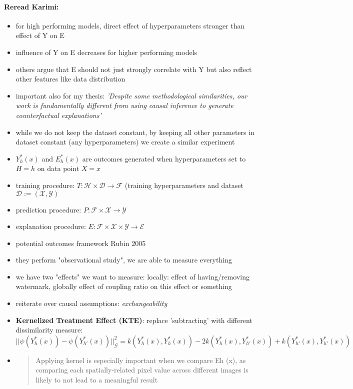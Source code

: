 \paragraph{Reread Karimi:}
\begin{itemize}
    \item for high performing models, direct effect of hyperparameters stronger than effect of Y on E
    \item influence of Y on E decreases for higher performing models
    \item others argue that E should not just strongly correlate with Y but also reflect other features like data distribution
    \item important also for my thesis: \textit{'Despite some methodological similarities, our work is fundamentally different from using causal inference to generate counterfactual explanations'}
    \item while we do not keep the dataset constant, by keeping all other parameters in dataset constant (any hyperparameters) we create a similar experiment
    \item $Y_h^*(x)$ and $E_h^*(x)$ are outcomes generated when hyperparameters set to $H= h$ on data point $X=x$
    \item training procedure: $T: \mathcal{H} \times \mathcal{D} \rightarrow \mathcal{F}$ (training hyperparameters and dataset $\mathcal{D}:= (\mathcal{X,Y})$
    \item prediction procedure: $P: \mathcal{F} \times \mathcal{X} \rightarrow \mathcal{Y}$
    \item explanation procedure: $E: \mathcal{F} \times \mathcal{X} \times \mathcal{Y} \rightarrow \mathcal{E}$ 
    \item potential outcomes framework Rubin 2005 \cite{Rubin2005}
    \item they perform "observational study", we are able to measure everything
    \item we have two "effects" we want to measure: locally: effect of having/removing watermark, globally effect of coupling ratio on this effect or something
    \item reiterate over causal assumptions: \textit{exchangeability}
    \item \textbf{Kernelized Treatment Effect (KTE)}: replace 'subtracting' with different dissimilarity measure: $
    ||\psi(Y_h^*(x)) - \psi(Y_{h'}^*(x))||_{\mathcal{G}}^2 =   k(Y_h^*(x), Y_h^*(x)) - 2k(Y_h^*(x),Y_{h'}^*(x)) + k(Y_{h'}^*(x),Y_{h'}^*(x))  
    $
    \item \begin{quote}Applying kernel is especially important when we compare Eh (x), as comparing each spatially-related pixel value across different images is likely to not lead to a meaningful result

\end{quote}
\end{itemize}
